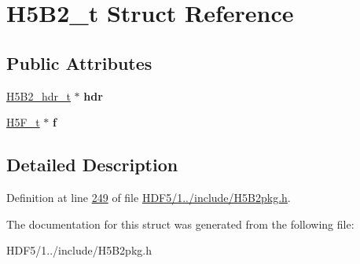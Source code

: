 \hypertarget{struct_h5_b2__t}{}\section{H5\+B2\+\_\+t Struct Reference}
\label{struct_h5_b2__t}
\subsection*{Public Attributes}
\begin{DoxyCompactItemize}
\item 
\mbox{\label{struct_h5_b2__t_acc52a121f58633efb0fe463f21d5fccc}} 
\hyperlink{struct_h5_b2__hdr__t}{H5\+B2\+\_\+hdr\+\_\+t} $\ast$ {\bfseries hdr}
\item 
\mbox{\label{struct_h5_b2__t_aadbb61ae9bf34b42d1a47442ac38ca91}} 
\hyperlink{struct_h5_f__t}{H5\+F\+\_\+t} $\ast$ {\bfseries f}
\end{DoxyCompactItemize}


\subsection{Detailed Description}


Definition at line \hyperlink{_h_d_f5_21_810_81_2include_2_h5_b2pkg_8h_source_l00249}{249} of file \hyperlink{_h_d_f5_21_810_81_2include_2_h5_b2pkg_8h_source}{H\+D\+F5/1../include/\+H5\+B2pkg.\+h}.



The documentation for this struct was generated from the following file\+:\begin{DoxyCompactItemize}
\item 
H\+D\+F5/1../include/\+H5\+B2pkg.\+h\end{DoxyCompactItemize}

